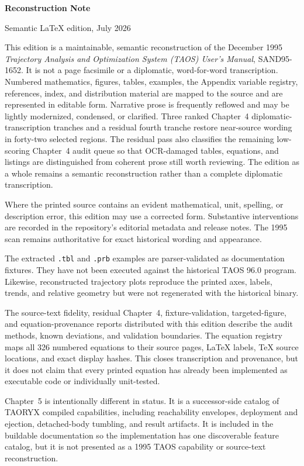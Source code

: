 \clearpage
{}
{}
\begin{center}
  {\sffamily\bfseries\LARGE Reconstruction Note}\par
  \vspace{0.5\baselineskip}
  {\small Semantic LaTeX edition, July 2026}
\end{center}
\vspace{0.8\baselineskip}

This edition is a maintainable, semantic reconstruction of the December 1995
\emph{Trajectory Analysis and Optimization System (TAOS) User's Manual},
SAND95-1652. It is not a page facsimile or a diplomatic, word-for-word
transcription. Numbered mathematics, figures, tables, examples, the Appendix
variable registry, references, index, and distribution material are mapped to the
source and are represented in editable form. Narrative prose is frequently reflowed
and may be lightly modernized, condensed, or clarified. Three ranked Chapter~4
diplomatic-transcription tranches and a residual fourth tranche restore near-source
wording in forty-two selected regions. The residual pass also classifies the remaining
low-scoring Chapter~4 audit queue so that OCR-damaged tables, equations, and listings
are distinguished from coherent prose still worth reviewing. The edition as a whole
remains a semantic reconstruction rather than a complete diplomatic transcription.

Where the printed source contains an evident mathematical, unit, spelling, or
description error, this edition may use a corrected form. Substantive interventions
are recorded in the repository's editorial metadata and release notes. The 1995 scan
remains authoritative for exact historical wording and appearance.

The extracted \texttt{.tbl} and \texttt{.prb} examples are parser-validated as
documentation fixtures. They have not been executed against the historical TAOS
96.0 program. Likewise, reconstructed trajectory plots reproduce the printed axes,
labels, trends, and relative geometry but were not regenerated with the historical
binary.

The source-text fidelity, residual Chapter~4, fixture-validation, targeted-figure,
and equation-provenance reports distributed with this edition describe the audit
methods, known deviations, and validation boundaries. The equation registry maps all
326 numbered equations to their source pages, LaTeX labels, TeX source locations,
and exact display hashes. This closes transcription and provenance, but it does not
claim that every printed equation has already been implemented as executable code or
individually unit-tested.

Chapter~5 is intentionally different in status. It is a successor-side catalog
of TAORYX compiled capabilities, including reachability envelopes, deployment
and ejection, detached-body tumbling, and result artifacts. It is included in
the buildable documentation so the implementation has one discoverable feature
catalog, but it is not presented as a 1995 TAOS capability or source-text
reconstruction.
\clearpage
